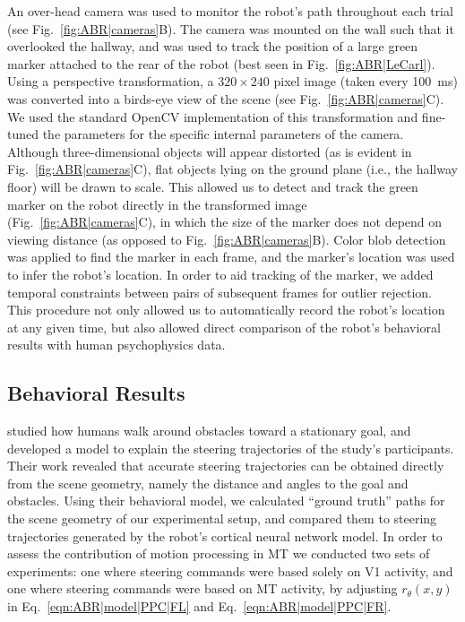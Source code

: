 An over-head camera was used to monitor the robot's path
throughout each trial (see Fig.~\ref{fig:ABR|cameras}B). 
The camera was mounted
on the wall such that it overlooked the hallway, and was used to
track the position of a large green marker attached to the rear of
the robot (best seen in Fig.~\ref{fig:ABR|LeCarl}). 
Using a perspective transformation,
a $320\times240$ pixel image (taken every \SI{100}{\milli\second})
was converted into a birds-eye view of the scene 
(see Fig.~\ref{fig:ABR|cameras}C).
We used the 
standard OpenCV implementation of this transformation and fine-tuned
the parameters for the specific internal parameters of the
camera. Although three-dimensional objects will appear distorted
(as is evident in Fig.~\ref{fig:ABR|cameras}C), 
flat objects lying on the ground plane
(i.e., the hallway floor) will be drawn to scale. This allowed us
to detect and track the green marker on the robot directly in the
transformed image (Fig.~\ref{fig:ABR|cameras}C),
in which the size of the marker does
not depend on viewing distance 
(as opposed to Fig.~\ref{fig:ABR|cameras}B). Color blob
detection was applied to find the marker in each frame, and the
marker's location was used to infer the robot's location. In order to
aid tracking of the marker, we added temporal constraints between
pairs of subsequent frames for outlier rejection. This procedure
not only allowed us to automatically record the robot's location at
any given time, but also allowed direct comparison of the robot's
behavioral results with human psychophysics data.


\subsection{Behavioral Results}
\cite{FajenWarren2003} studied how humans walk around
obstacles toward a stationary goal, and developed a model to
explain the steering trajectories of the study's participants. Their
work revealed that accurate steering trajectories can be obtained
directly from the scene geometry, namely the distance and angles
to the goal and obstacles. Using their behavioral model, we
calculated ``ground truth'' paths for the scene geometry of our
experimental setup, and compared them to steering trajectories
generated by the robot's cortical neural network model. In order to
assess the contribution of motion processing in \ac{MT} we conducted
two sets of experiments: one where steering commands were
based solely on \ac{V1} activity, and one where steering commands
were based on \ac{MT} activity, by adjusting 
$r_\theta(x,y)$ in Eq.~\ref{eqn:ABR|model|PPC|FL} and 
Eq.~\ref{eqn:ABR|model|PPC|FR}.

